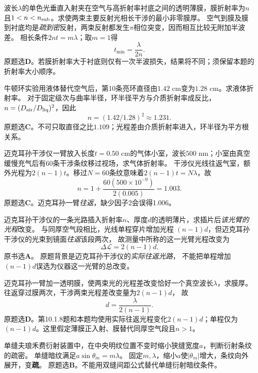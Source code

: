 \problemtext 波长$\lambda$的单色光垂直入射夹在空气与高折射率衬底之间的透明薄膜，膜折射率为$n$且$1<n<n_{\rm sub}$。求使两束主要反射光相长干涉的最小非零膜厚。
\workings
空气到膜及膜到衬底均是\emph{疏到密}反射，两束反射都发生$\pi$相位突变，因而相互比较无附加半波差。
相长条件$2nt=m\lambda$；取$m=1$得
\[
\boxed{t_{\min}=\frac{\lambda}{2n}}.
\]
原题选\textbf{D}。\crosscheck 若膜折射率大于衬底则仅有一次半波损失，结果将不同；须保留本题的折射率大小顺序。

\problemtext 牛顿环实验用液体替代空气后，第10条亮环直径由$1.42$ cm变为$1.28$ cm。求液体折射率。
\workings
对于固定级次与曲率半径，环半径平方与介质折射率成反比，
$n=(D_{\rm air}/D_{\rm liq})^2$，因此
\[
\boxed{n=(1.42/1.28)^2\approx1.231}.
\]
原题选\textbf{C}。\crosscheck 不可只取直径之比$1.109$；光程差由介质折射率进入，环半径为平方根关系。

\problemtext 迈克耳孙干涉仪一臂放入长度$t=0.50$ cm的气体小室，波长$500$ nm；小室由真空缓慢充气后有60条干涉条纹移过视场，求气体折射率。
\workings
干涉仪光线往返气室，额外光程为$2(n-1)t$。移过$N=60$条纹意味着$2(n-1)t=N\lambda$，故
\[
\boxed{n=1+\frac{60(500\times10^{-9})}{2(0.005)}
=1.003}.
\]
原题选\textbf{C}。\crosscheck 迈克耳孙一臂\emph{往返}，缺少因子2会误得1.006。

\problemtext 迈克耳孙干涉仪的一条光路插入折射率$n$、厚度$d$的透明薄片，求插片后\emph{该光臂的光程}改变。
\workings
与同厚空气段相比，光线单程穿片增加光程
$(n-1)d$，但迈克耳孙干涉仪的光束到镜面\emph{往返}该段两次，
故测量中所称的这一光臂光程改变为
\[
\boxed{\Delta\mathcal L=2(n-1)d}.
\]
原书选\textbf{A}。
\crosscheck 原题背景是迈克耳孙干涉仪的\emph{实际往返光路}，
不能把单程增加$(n-1)d$误选为仪器这一光臂的总改变。

\problemtext 迈克耳孙一臂加一透明膜，使两束光的光程差改变恰好一个真空波长$\lambda$，求膜厚。
\workings
往返穿过膜两次，干涉两束光程差改变量为$2(n-1)d$，
故
\[
\boxed{d=\frac{\lambda}{2(n-1)}}.
\]
原题选\textbf{D}。\crosscheck 第10.1.8题和本题均使用实际往返光程变化$2(n-1)d$；单程仅为$(n-1)d$。这里假定薄膜正入射、膜替代同厚空气段且$n>1$。

\problemtext 单缝夫琅禾费衍射装置中，在中央明纹位置不变时缩小狭缝宽度$a$，判断衍射条纹的疏密。
\workings
单缝暗纹满足$a\sin\theta_m=m\lambda$。
固定$m,\lambda$，缩小$a$使$|\theta_m|$增大，条纹向外展开，变\textbf{疏}。
原题选\textbf{B}。\crosscheck 不能用双缝间距公式替代单缝衍射暗纹条件。

